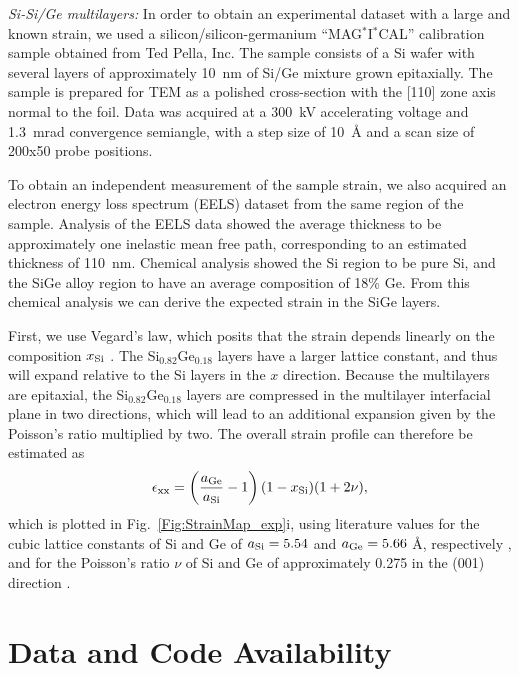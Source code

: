 \documentclass[%
 reprint,
superscriptaddress,
 amsmath,
 amssymb,
 prl,
]{revtex4-2}
\begin{document}

\textit{Si-Si/Ge multilayers:} In order to obtain an experimental dataset with a large and known strain, we used a silicon/silicon-germanium ``MAG$^*$I$^*$CAL'' calibration sample obtained from Ted Pella, Inc. The sample consists of a Si wafer with several layers of approximately 10~nm of Si/Ge mixture grown epitaxially. The sample is prepared for TEM as a polished cross-section with the [110] zone axis normal to the foil. Data was acquired at a 300~kV accelerating voltage and 1.3~mrad convergence semiangle, with a step size of 10~\AA{} and a scan size of 200x50 probe positions. 

To obtain an independent measurement of the sample strain, we also acquired an electron energy loss spectrum (EELS) dataset from the same region of the sample. Analysis of the EELS data showed the average thickness to be approximately one inelastic mean free path, corresponding to an estimated thickness of 110~nm. Chemical analysis showed the Si region to be pure Si, and the SiGe alloy region to have an average composition of 18\% Ge. From this chemical analysis we can derive the expected strain in the SiGe layers.

First, we use Vegard's law, which posits that the strain depends linearly on the composition $x_{\rm{Si}}$ \cite{vegard1921konstitution}.  The Si$_{0.82}$Ge$_{0.18}$ layers have a larger lattice constant, and thus will expand relative to the Si layers in the $x$ direction. Because the multilayers are epitaxial, the Si$_{0.82}$Ge$_{0.18}$ layers are compressed in the multilayer interfacial plane in two directions, which will lead to an additional expansion given by the Poisson's ratio multiplied by two. The overall strain profile can therefore be estimated as
\begin{equation}
    \epsilon_{\rm{xx}} 
    = 
    \left(
        \frac{a_{\rm{Ge}}}{a_{\rm{Si}}}-1
    \right)
    (1 - x_{\rm{Si}})
    (1 + 2 \nu),
\end{equation}
which is plotted in Fig.~\ref{Fig:StrainMap_exp}i, using literature values for the cubic lattice constants of Si and Ge of $a_{\rm{Si}} = 5.54$ and $a_{\rm{Ge}} = 5.66$ \AA{}, respectively \cite{johnson1954some}, and for the Poisson's ratio $\nu$ of Si and Ge of approximately 0.275 in the (001) direction \cite{wortman1965young}.




\section*{Data and Code Availability}
\end{document}
